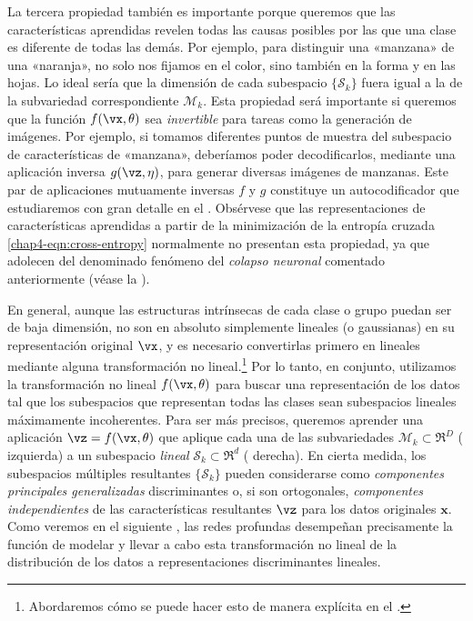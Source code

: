 \documentclass[../../book-main.tex]{subfiles}
\begin{document}
La tercera propiedad también es importante porque queremos que las características aprendidas
revelen todas las causas posibles por las que una clase es diferente
de todas las demás. Por ejemplo, para distinguir una «manzana» de
una «naranja», no solo nos fijamos en el color, sino también en la forma y en las
hojas. Lo ideal sería que la dimensión de cada subespacio $\{\mathcal{S}_k\}$
fuera igual a la de la subvariedad correspondiente
$\mathcal{M}_k$. Esta propiedad será importante si queremos que la
función $f(\vx,\theta)$ sea {\em invertible} para tareas como la
generación de imágenes. Por ejemplo, si tomamos diferentes puntos de muestra del
subespacio de características de «manzana», deberíamos poder decodificarlos, mediante
una aplicación inversa $g(\vz, \eta)$, para generar diversas imágenes de manzanas.
Este par de aplicaciones mutuamente inversas $f$ y $g$ constituye un
autocodificador que estudiaremos con gran detalle en el
. Obsérvese que las representaciones de características
aprendidas a partir de la minimización de la entropía cruzada \eqref{chap4-eqn:cross-entropy}
normalmente no presentan esta propiedad, ya que adolecen del denominado fenómeno del {\em
colapso neuronal} comentado anteriormente (véase la
).

En general, aunque las estructuras intrínsecas de cada clase o grupo
puedan ser de baja dimensión, no son en absoluto simplemente lineales (o
gaussianas) en su representación original $\vx$, y es necesario
convertirlas primero en lineales mediante alguna transformación no lineal.\footnote{Abordaremos
    cómo se puede hacer esto de manera explícita en el
.} Por lo tanto, en conjunto, utilizamos
la transformación no lineal
$f(\vx,\theta)$ para buscar una representación de los datos
tal que los subespacios que representan todas las clases sean subespacios lineales
máximamente incoherentes. Para ser más precisos, queremos aprender una
aplicación {$\vz = f(\vx,\theta)$} que aplique cada una de las subvariedades
$\mathcal{M}_k \subset \Re^D$ ( izquierda) a
un subespacio {\em lineal} $\mathcal{S}_k \subset \Re^d$
( derecha). En cierta medida, los
subespacios múltiples resultantes $\{\mathcal{S}_k\}$ pueden considerarse como
{\em componentes principales generalizadas} discriminantes \cite{GPCA} o,
si son ortogonales, {\em componentes independientes}
\cite{hyvarinen2000independent} de las características resultantes $\vz$ para
los datos originales $\bm x$.
Como veremos en el siguiente , las redes profundas
desempeñan precisamente la función de modelar y llevar a cabo esta transformación no lineal
de la distribución de los datos a representaciones discriminantes lineales.
\end{document}
